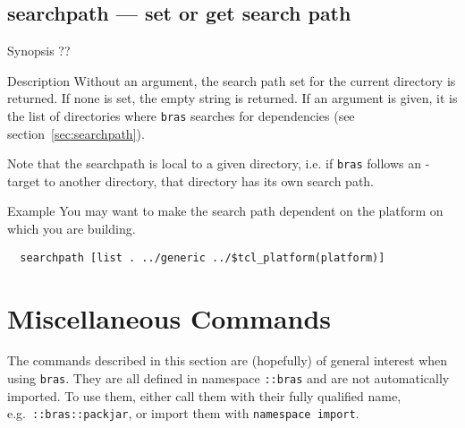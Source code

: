 \documentclass[11pt,bibtotoc,idxtotoc]{scrreprt}
\newcommand{\bras}{\texttt{bras}}
\begin{document}
\subsection{searchpath --- set or get search path}
\begin{Describe}
\item[Synopsis]  ??
\item[Description] Without an argument, the search path set for the
  current directory is returned. If none is set, the empty string is
  returned. If an argument is given, it is the list of directories
  where \bras{} searches for dependencies (see
  section~\ref{sec:searchpath}). 

  Note that the searchpath is local to a given directory, i.e. if
  \bras{} follows an -target to another directory, that
  directory has its own search path.
\item[Example]
You may want to make the search path dependent on the platform on
which you are building.
\begin{verbatim}
  searchpath [list . ../generic ../$tcl_platform(platform)]
\end{verbatim}
\end{Describe}
\section{Miscellaneous Commands}

The commands described in this section are (hopefully) of general
interest when using \bras{}. They are all defined in namespace
\texttt{::bras} and are not automatically imported. To use them,
either call them with their fully qualified name, e.g.\ 
\texttt{::bras::packjar}, or import them with \texttt{namespace
  import}.

\end{document}
